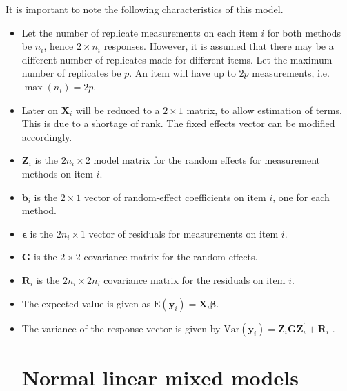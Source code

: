 It is important to note the following characteristics of this model.
\begin{itemize}
\item Let the number of replicate measurements on each item $i$ for both methods be $n_i$, hence $2 \times n_i$ responses. However, it is assumed that there may be a different number of replicates made for different items. Let the maximum number of replicates be $p$. An item will have up to $2p$ measurements, i.e. $\max(n_{i}) = 2p$.


\item Later on $\boldsymbol{X}_i$ will be reduced to a $2 \times 1$ matrix, to allow estimation of terms. This is due to a shortage of rank. The fixed effects vector can be modified accordingly.
\item $\boldsymbol{Z}_i$ is the $2n_i \times  2$ model matrix for the random effects for measurement methods on item $i$.
\item $\boldsymbol{b}_i$ is the $2 \times  1$ vector of random-effect coefficients on item $i$, one for each method.
\item $\boldsymbol{\epsilon}$  is the $2n_i \times  1$ vector of residuals for measurements on item $i$.
\item $\boldsymbol{G}$ is the $2 \times  2$ covariance matrix for the random effects.
\item $\boldsymbol{R}_i$ is the $2n_i \times  2n_i$ covariance matrix for the residuals on item $i$.
\item The expected value is given as $\mbox{E}(\boldsymbol{y}_i) = \boldsymbol{X}_i\boldsymbol{\beta}.$ \citep{hamlett}
\item The variance of the response vector is given by $\mbox{Var}(\boldsymbol{y}_i)  = \boldsymbol{Z}_i \boldsymbol{G} \boldsymbol{Z}_i^{\prime} + \boldsymbol{R}_i$ \citep{hamlett}.
 


\section{Normal linear mixed models}


\end{itemize}
